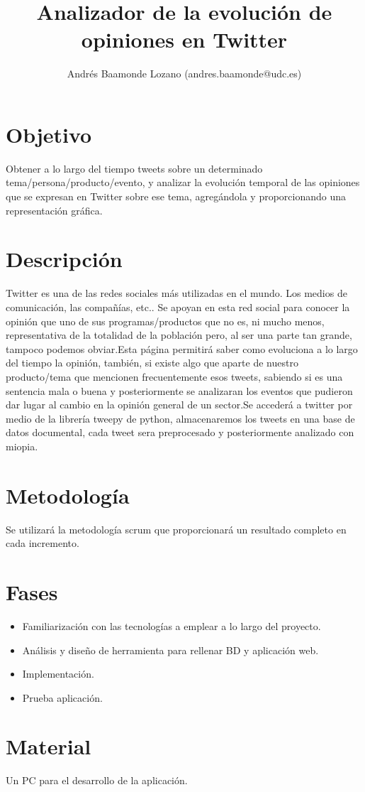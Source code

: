 \documentclass[12pt,a4paper]{article}
\title{Analizador de la evolución de opiniones en Twitter}
\author{Andrés Baamonde Lozano (andres.baamonde@udc.es)}
\begin{document}
\maketitle


\section{Objetivo}
Obtener a lo largo del tiempo tweets sobre un determinado tema/persona/producto/evento, y analizar la evolución temporal de las opiniones que se expresan en Twitter sobre ese tema, agregándola y proporcionando una representación gráfica.
\section{Descripción}
Twitter es una de las redes sociales más utilizadas en el mundo. Los medios de comunicación, las compañías, etc.. Se apoyan en esta red social para conocer la opinión que uno de sus programas/productos que no es, ni mucho menos, representativa de la totalidad de la población pero, al ser una parte tan grande, tampoco podemos obviar.Esta página permitirá saber como evoluciona a lo largo del tiempo la opinión, también, si existe algo que aparte de nuestro producto/tema que mencionen frecuentemente esos tweets, sabiendo si es una sentencia mala o buena y posteriormente se analizaran los eventos que pudieron dar lugar al cambio en la opinión general de un sector.Se accederá a twitter por medio de la librería tweepy de python, almacenaremos los tweets en una base de datos documental, cada tweet sera preprocesado y posteriormente analizado con miopia.
\section{Metodología}
Se utilizará la metodología scrum que proporcionará un resultado completo en  cada incremento.
\section{Fases}
\begin{itemize}
\item Familiarización con las tecnologías a emplear a lo largo del proyecto.
\item Análisis y diseño de herramienta para rellenar BD y aplicación web.
\item Implementación.
\item Prueba aplicación.
\end{itemize}
\section{Material}
Un PC para el desarrollo de la aplicación.
\end{document}
